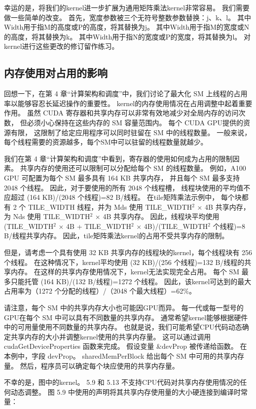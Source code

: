 幸运的是，将我们的kernel进一步扩展为通用矩阵乘法kernel非常容易。 我们需要做一些简单的改变。 
首先，宽度参数被三个无符号整数参数替换：j、k、l。 其中Width用于指M的高度或P的高度，将其替换为j。 
其中Width用于指M的宽度或N的高度，将其替换为k。 其中Width用于指N的宽度或P的宽度，将其替换为l。 
对kernel进行这些更改的修订留作练习。

\subsection{内存使用对占用的影响}
回想一下，在第 4 章“计算架构和调度”中，我们讨论了最大化 SM 上线程的占用率以能够容忍长延迟操作的重要性。 
kernel的内存使用情况在占用调整中起着重要作用。 虽然 CUDA 寄存器和共享内存可以非常有效地减少对全局内存的访问次数，
但必须小心保持在这些内存的 SM 容量范围内。 每个 CUDA GPU提供的资源有限，
这限制了给定应用程序可以同时驻留在 SM 中的线程数量。 一般来说，每个线程需要的资源越多，每个SM中可以驻留的线程数量就越少。

我们在第 4 章“计算架构和调度”中看到，寄存器的使用如何成为占用的限制因素。 
共享内存的使用还可以限制可以分配给每个 SM 的线程数量。 例如，A100 GPU 可配置为每个 SM 最多具有 164 KB 共享内存，
并且每个 SM 最多支持 2048 个线程。 因此，对于要使用的所有 2048 个线程槽，
线程块使用的平均值不应超过 (164 KB)/(2048 个线程)=82 B/线程。 在tile矩阵乘法示例中，
每个块都有 2 个 TILE\_WIDTH 线程，并为 Mds 使用 TILE\_WIDTH$^2$ × 4B 共享内存，
为 Nds 使用 TILE\_WIDTH$^2$ × 4B 共享内存。 
因此，线程块平均使用 (TILE\_WIDTH$^2$ × 4B + TILE\_WIDTH$^2$ × 4B)/(TILE\_WIDTH$^2$ 个线程)=8 B/线程共享内存。 
因此，tile矩阵乘法kernel的占用不受共享内存的限制。

但是，请考虑一个具有使用 32 KB 共享内存的线程块的kernel，每个线程块有 256 个线程。 
在这种情况下，kernel平均使用 (32 KB)/(256 个线程)=132 B/线程的共享内存。 
在这样的共享内存使用情况下，kernel无法实现完全占用。 每个 SM 最多只能托管 (164 KB)/(132 B/线程)=1272 个线程。 
因此，该kernel可达到的最大占用率为（1272 个分配的线程）/（2048 个最大线程）=62\%。

请注意，每个 SM 中的共享内存大小也可能因GPU而异。 每一代或每一型号的GPU在每个 SM 中可以具有不同数量的共享内存。 
通常希望kernel能够根据硬件中的可用量使用不同数量的共享内存。 
也就是说，我们可能希望CPU代码动态确定共享内存的大小并调整kernel使用的共享内存量。 
这可以通过调用 cudaGetDeviceProperties 函数来完成。 假设变量 \&devProp 被传递给函数。 
在本例中，字段 devProp。 sharedMemPerBlock 给出每个 SM 中可用的共享内存量。 
然后，程序员可以确定每个块应使用的共享内存量。

不幸的是，图中的kernel。 5.9 和 5.13 不支持CPU代码对共享内存使用情况的任何动态调整。 
图 5.9 中使用的声明将其共享内存使用量的大小硬连接到编译时常量：

